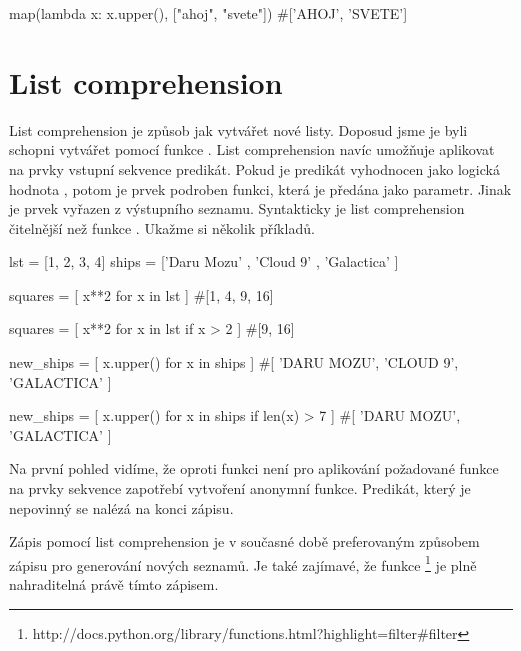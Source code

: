 \begin{python}
map(lambda x: x.upper(), ["ahoj", "svete"])
#['AHOJ', 'SVETE']
\end{python}


\section{List comprehension}

List comprehension je způsob jak vytvářet nové listy. Doposud jsme je byli schopni vytvářet pomocí
funkce . List comprehension navíc umožňuje aplikovat na prvky vstupní sekvence predikát.
Pokud je predikát vyhodnocen jako logická hodnota , potom je prvek podroben
funkci, která je předána jako parametr. Jinak je prvek vyřazen z výstupního seznamu.
Syntakticky je list comprehension čitelnější než funkce
. Ukažme si několik příkladů.


\begin{python}
lst = [1, 2, 3, 4]
ships = ['Daru Mozu' , 'Cloud 9' , 'Galactica' ]

squares = [ x**2 for x in lst ]
#[1, 4, 9, 16]

squares = [ x**2 for x in lst if x > 2 ]
#[9, 16]

new_ships = [ x.upper() for x in ships ]
#[ 'DARU MOZU', 'CLOUD 9', 'GALACTICA' ]

new_ships = [ x.upper() for x in ships if len(x) > 7 ]
#[ 'DARU MOZU', 'GALACTICA' ]
\end{python}

Na první pohled vidíme, že oproti funkci  není pro aplikování požadované funkce na prvky
sekvence zapotřebí vytvoření anonymní funkce. Predikát, který je nepovinný se nalézá na konci zápisu.

Zápis pomocí list comprehension je v současné době preferovaným způsobem zápisu pro generování
nových seznamů. Je také zajímavé, že funkce 
\footnote{http://docs.python.org/library/functions.html?highlight=filter\#filter}
je plně nahraditelná právě tímto zápisem.
